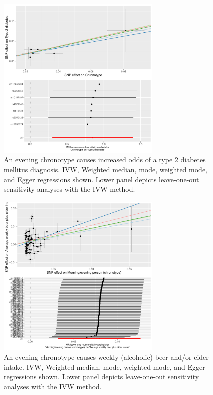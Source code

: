 \documentclass[journal,article,submit,moreauthors,pdftex]{Definitions/mdpi}
\begin{document}
\begin{figure}[htbp]
	\centering
         \includegraphics[width=0.7\textwidth]{Figs/Analysis2/Chronotype_vs_Type_2_diabetes.Plots.pdf}
    \caption{An evening chronotype causes increased odds of a type 2 diabetes mellitus diagnosis. IVW, Weighted median, mode, weighted mode, and Egger regressions shown. Lower panel depicts leave-one-out sensitivity analyses with the IVW method.}
	\label{beer}
\end{figure}

\begin{figure}[htbp]
	\centering
         \includegraphics[width=0.7\textwidth]{Figs/Analysis2/Morning_evening_person_(chronotype)_vs_Average_weekly_beer_plus_cider_intake.Plots.pdf}
    \caption{An evening chronotype causes weekly (alcoholic) beer and/or cider intake. IVW, Weighted median, mode, weighted mode, and Egger regressions shown. Lower panel depicts leave-one-out sensitivity analyses with the IVW method.}
	\label{beer}
\end{figure}
\end{document}
